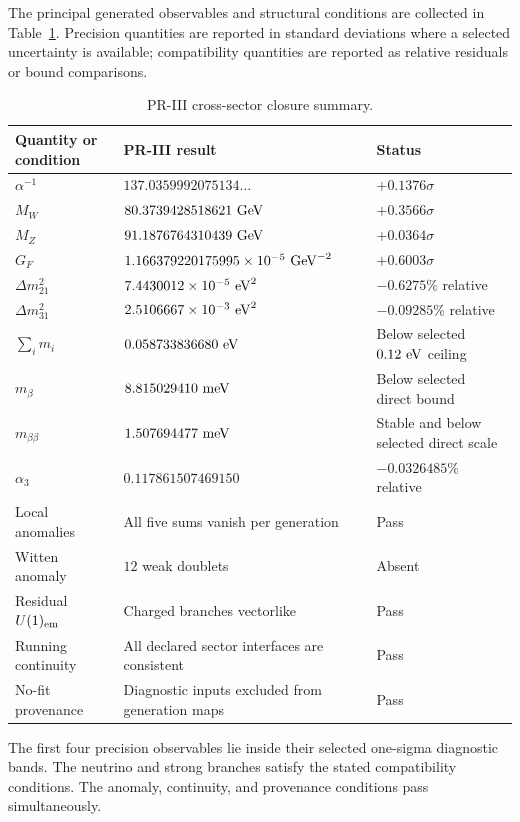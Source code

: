 \documentclass[11pt]{article}
\begin{document}
The principal generated observables and structural conditions are collected in Table~\ref{tab:priii-global-results}.  Precision quantities are reported in standard deviations where a selected uncertainty is available; compatibility quantities are reported as relative residuals or bound comparisons.

\begin{table}[htbp]
\centering
\caption{PR-III cross-sector closure summary.}
\label{tab:priii-global-results}
\small
\begin{tabular}{lll}
\toprule
\textbf{Quantity or condition} & \textbf{PR-III result} & \textbf{Status} \\
\midrule
\(\alpha^{-1}\)
& \(137.0359992075134\ldots\)
& \(+0.1376\sigma\) \\
\(M_W\)
& \(80.3739428518621\ {\rm GeV}\)
& \(+0.3566\sigma\) \\
\(M_Z\)
& \(91.1876764310439\ {\rm GeV}\)
& \(+0.0364\sigma\) \\
\(G_F\)
& \(1.166379220175995\times10^{-5}\ {\rm GeV}^{-2}\)
& \(+0.6003\sigma\) \\
\(\Delta m_{21}^2\)
& \(7.4430012\times10^{-5}\ {\rm eV}^2\)
& \(-0.6275\%\) relative \\
\(\Delta m_{31}^2\)
& \(2.5106667\times10^{-3}\ {\rm eV}^2\)
& \(-0.09285\%\) relative \\
\(\sum_i m_i\)
& \(0.058733836680\ {\rm eV}\)
& Below selected \(0.12\ {\rm eV}\) ceiling \\
\(m_\beta\)
& \(8.815029410\ {\rm meV}\)
& Below selected direct bound \\
\(m_{\beta\beta}\)
& \(1.507694477\ {\rm meV}\)
& Stable and below selected direct scale \\
\(\alpha_3\)
& \(0.117861507469150\)
& \(-0.0326485\%\) relative \\
Local anomalies
& All five sums vanish per generation
& Pass \\
Witten anomaly
& \(12\) weak doublets
& Absent \\
Residual \(U(1)_{\rm em}\)
& Charged branches vectorlike
& Pass \\
Running continuity
& All declared sector interfaces are consistent
& Pass \\
No-fit provenance
& Diagnostic inputs excluded from generation maps
& Pass \\
\bottomrule
\end{tabular}
\end{table}

The first four precision observables lie inside their selected one-sigma diagnostic bands.  The neutrino and strong branches satisfy the stated compatibility conditions.  The anomaly, continuity, and provenance conditions pass simultaneously.
\end{document}
